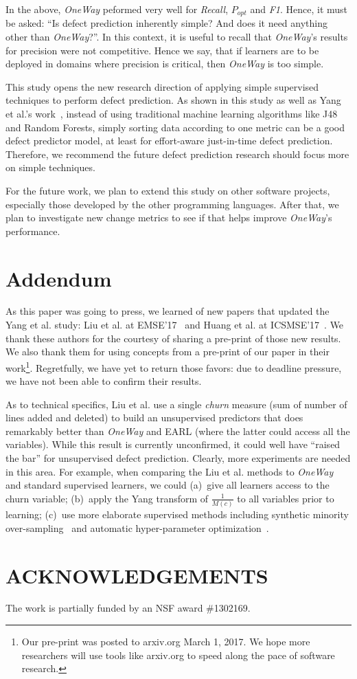 \documentclass[sigconf]{acmart}
\theoremstyle{break}
\begin{document}
In the above, {\em OneWay} peformed very well for   {\it Recall}, $P_{opt}$ and {\it F1}. Hence, it must be asked: ``Is defect
prediction inherently simple? And does it need
anything other than {\em OneWay}?''. In this context,
it is useful to recall that  {\em OneWay}'s results
for precision were not competitive.
Hence we say, that if learners are to be deployed in domains
where precision is critical, then {\em OneWay} is too simple. 

This study opens the new research direction of applying simple supervised 
techniques to perform defect prediction. As shown in this
study as well as Yang et al.'s work~\cite{yang2016effort}, instead of using
traditional machine learning algorithms like J48 and Random Forests, simply sorting
data according to one metric can be a good defect predictor model, at least for
effort-aware just-in-time defect prediction. Therefore, we recommend the future
defect prediction research should focus more on simple techniques.

For the future work, we plan to extend this study on other software projects,
especially those developed by the other programming languages. After that,
we plan to investigate new change metrics to see if that helps improve
{\it OneWay}'s performance.


\section{Addendum}
As this paper was going to press, we learned of  new
 papers that updated  the Yang et al. study: 
Liu et al.
at EMSE'17~\cite{liu2017code} and Huang et al. at 
ICSMSE'17~\cite{huang17}. 
We thank these authors
for the courtesy of sharing a
pre-print of those new results. We also thank them for 
using 
concepts from a  pre-print of our paper in their work\footnote{
Our pre-print was posted to arxiv.org March 1, 2017. We hope more
researchers will use tools like arxiv.org to speed along the pace of software research.}.
Regretfully, we have yet to return those favors:
due to deadline pressure, we have not 
been able to confirm   their results. 

As to  technical specifics, Liu et al.  use a single {\em churn}   measure
(sum of number of lines added and deleted)
to build an unsupervised predictors that  does remarkably better than 
{\em OneWay} and EARL (where the latter  could access
all the variables).  
While this result is currently unconfirmed, 
it could well have ``raised the bar''
for unsupervised defect prediction. Clearly,
 more experiments are needed in this area.  
For example, when comparing the Liu et al. methods
to  {\em OneWay} and standard supervised learners, we could (a)~give
all learners access to the churn variable;  (b)~apply the Yang   transform of $\frac{1}{M(c)}$ to all variables prior to learning;
(c)~use  more elaborate supervised methods including  synthetic minority over-sampling~\cite{Agrawa17} and automatic hyper-parameter optimization~\cite{fu2016tuning}.
 


\section*{ACKNOWLEDGEMENTS}
The work is partially funded by an NSF award \#1302169.

\balance

 
\end{document}

